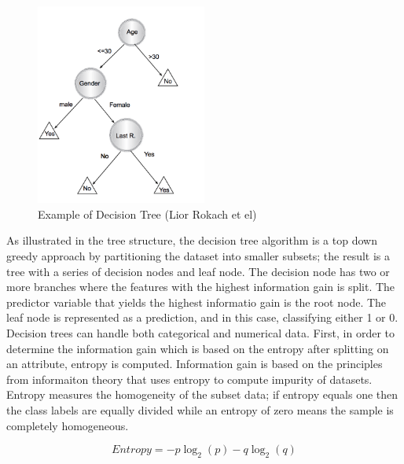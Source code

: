 \documentclass{llncs}
\begin{document}
\begin{figure}
\centering
\includegraphics[width=0.5\textwidth]{decisiontree.png}
\caption{Example of Decision Tree (Lior Rokach et el)}
\end{figure}


As illustrated in the tree structure, the decision tree algorithm is a top down greedy approach by partitioning the dataset into smaller subsets; the result is a tree with a series of decision nodes and leaf node. The decision node has two or more branches where the features with the highest information gain is split. The predictor variable that yields the highest informatio gain is the root node. The leaf node is represented as a prediction, and in this case, classifying either 1 or 0. Decision trees can handle both categorical and numerical data. First, in order to determine the information gain which is based on the entropy after splitting on an attribute, entropy is computed. Information gain is based on the principles from informaiton theory that uses entropy to compute impurity of datasets. Entropy measures the homogeneity of the subset data; if entropy equals one then the class labels are equally divided while an entropy of zero means the sample is completely homogeneous. 


\begin{equation}
Entropy = -p\log_{2}(p) - q\log_{2}(q)
\end{equation}
\end{document}
